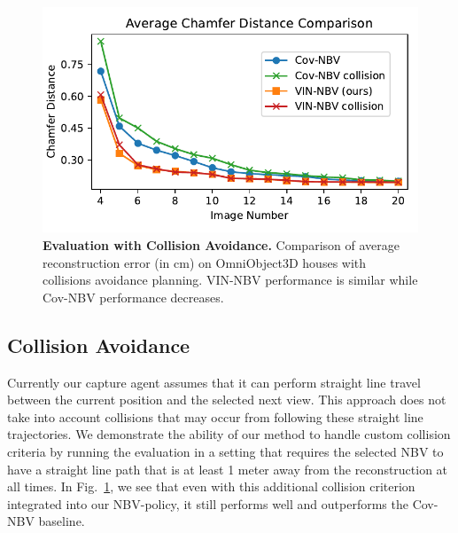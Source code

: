\begin{figure}
  \centering
  \vspace{-1.3em}
\includegraphics[width=0.94\columnwidth]{Figures/collision_comparison.pdf}
  \vspace{-1.3em}
    \caption{
        \textbf{Evaluation with Collision Avoidance.} Comparison of average reconstruction error (in cm) on OmniObject3D \cite{wu2023omniobject3d} houses with collisions avoidance planning. VIN-NBV performance is similar while Cov-NBV performance decreases.
    }
    \label{fig:collision_comparison}
    \vspace{0.5em}
\end{figure}

\subsection{Collision Avoidance}
\label{sec:collision_avoidance}
\vspace{-0.25em}

Currently our capture agent assumes that it can perform straight line travel between the current position and the selected next view. This approach does not take into account collisions that may occur from following these straight line trajectories. We demonstrate the ability of our method to handle custom collision criteria by running the evaluation in a setting that requires the selected NBV to have a straight line path that is at least 1 meter away from the reconstruction at all times. In Fig.~\ref{fig:collision_comparison}, we see that even with this additional collision criterion integrated into our NBV-policy, it still performs well and outperforms the Cov-NBV baseline.


